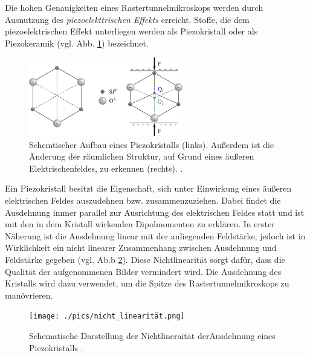 Die hohen Genauigkeiten eines Rastertunnelmikroskops werden durch Ausnutzung des
\emph{piezoelekttrischen Effekts} erreicht. %
Stoffe, die dem piezoelektrischen Effekt unterliegen werden als Piezokristall %
oder als Piezokeramik (vgl. Abb. \ref{fig: piezo}) bezeichnet.
\begin{figure}[!h]
  \centering
  \includegraphics[width=0.6\textwidth]{./pics/piezo.png}
  \caption{Schemtischer Aufbau eines Piezokristalls (links). Außerdem ist die Änderung der räumlichen Struktur, auf Grund eines
  äußeren Elektrischenfeldes, zu erkennen (rechts). \cite{piezo}.}
  \label{fig: piezo}
\end{figure}
Ein Piezokristall besitzt die Eigenschaft, sich unter Einwirkung eines äußeren
elektrischen Feldes auszudehnen bzw. zusammenzuziehen.
Dabei findet die Ausdehnung immer parallel zur
Ausrichtung des elektrischen Feldes statt und ist mit den in dem Kristall wirkenden
Dipolmomenten zu erklären. In erster Näherung ist die Ausdehnung linear mit der anliegenden Feldstärke,
jedoch ist in Wirklichkeit ein nicht linearer Zusammenhang zwischen Ausdehnung und Feldstärke
gegeben (vgl. Ab.b \ref{fig: non_linear}). Diese Nichtlinearität sorgt dafür, dass die Qualität der aufgenommenen Bilder
vermindert wird. Die Ausdehnung des Kristalls wird dazu verwendet, um die Spitze des Rastertunnelmikroskops zu manövrieren.
\begin{figure}[!h]
  \centering
  \texttt{[image: ./pics/nicht\_linearität.png]}
  \caption{Schematische Darstellung der Nichtlineraität derAusdehnung eines Piezokristalls \cite{rtm}.} %
  \label{fig: non_linear}
\end{figure}

